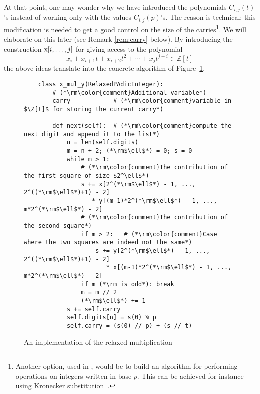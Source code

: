 \documentclass[11pt]{article}
\numberwithin{equation}{section}
\numberwithin{figure}{section}
\theoremstyle{definition}
\newcommand{\Z}{\mathbb Z}
\newcommand{\ttx}{\texttt{\rm x}\xspace}
\begin{document}
At that point, one may wonder why we have introduced the polynomials 
$C_{i,j}(t)$'s instead of working only with the values $C_{i,j}(p)$'s. 
The reason is technical: this modification is needed to get a good 
control on the size of the carries\footnote{Another option, used in 
\cite{BeHoLe11}, would be to build an algorithm for performing 
operations on integers written in base $p$. This can be achieved for 
instance using Kronecker substitution~\cite[Corollary~8.27]{GaGe03}.}. 
We will elaborate on this later (see Remark \ref{rem:carry} below).
By introducing the construction $\ttx[i, \ldots, j]$ for giving access
to the polynomial
$$x_i + x_{i+1} t + x_{i+2} t^2 + \cdots + x_j t^{j-i} \in \Z[t]$$
the above ideas translate into the concrete algorithm of 
Figure~\ref{fig:relaxedmulimpl}.
%
\begin{figure}
\begin{lstlisting}
    class x_mul_y(RelaxedPAdicInteger):
        # (*\rm\color{comment}Additional variable*)
        carry            # (*\rm\color{comment}variable in $\Z[t]$ for storing the current carry*)

        def next(self):  # (*\rm\color{comment}compute the next digit and append it to the list*)
            n = len(self.digits)
            m = n + 2; (*\rm$\ell$*) = 0; s = 0
            while m > 1:
                # (*\rm\color{comment}The contribution of the first square of size $2^\ell$*)
                s += x[2^(*\rm$\ell$*) - 1, ..., 2^((*\rm$\ell$*)+1) - 2]
                   * y[(m-1)*2^(*\rm$\ell$*) - 1, ..., m*2^(*\rm$\ell$*) - 2]
                # (*\rm\color{comment}The contribution of the second square*)
                if m > 2:   # (*\rm\color{comment}Case where the two squares are indeed not the same*)
                    s += y[2^(*\rm$\ell$*) - 1, ..., 2^((*\rm$\ell$*)+1) - 2]
                       * x[(m-1)*2^(*\rm$\ell$*) - 1, ..., m*2^(*\rm$\ell$*) - 2]
                if m (*\rm is odd*): break
                m = m // 2
                (*\rm$\ell$*) += 1
            s += self.carry
            self.digits[n] = s(0) % p
            self.carry = (s(0) // p) + (s // t)
\end{lstlisting}

\caption{An implementation of the relaxed multiplication}
\label{fig:relaxedmulimpl}
\end{figure}
\end{document}
